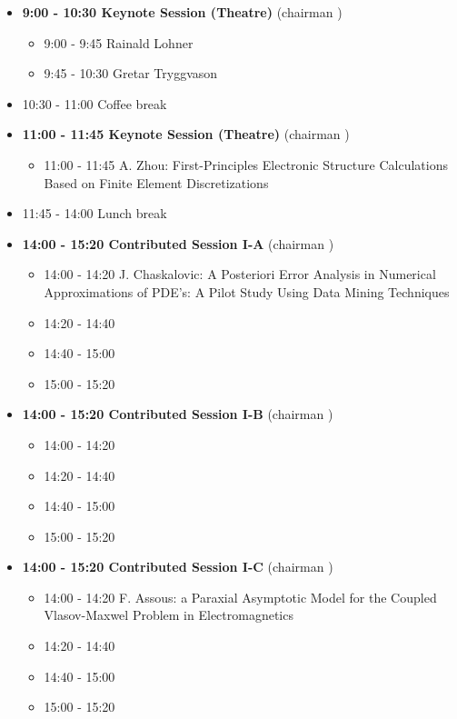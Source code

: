 \documentclass[10pt, A4]{article}%
\begin{document}
\begin{itemize}    
  \item {\bf 9:00 - 10:30 Keynote Session (Theatre)} (chairman ) 
  \begin{itemize}
    \item 9:00 - 9:45 Rainald Lohner
    \item 9:45 - 10:30 Gretar Tryggvason
  \end{itemize}
  \item 10:30 - 11:00 Coffee break
  \item {\bf 11:00 - 11:45 Keynote Session (Theatre)} (chairman ) 
  \begin{itemize}
    \item 11:00 - 11:45 {A. Zhou}: {First-Principles Electronic Structure Calculations Based on Finite Element Discretizations}
  \end{itemize}
  \item 11:45 - 14:00 Lunch break      
  \item {\bf 14:00 - 15:20 Contributed Session I-A} (chairman ) 
  \begin{itemize}
    \item 14:00 - 14:20 {J. Chaskalovic}: {A Posteriori Error Analysis in Numerical Approximations of PDE's: A Pilot Study Using Data Mining Techniques}
    \item 14:20 - 14:40 
    \item 14:40 - 15:00 
    \item 15:00 - 15:20 
  \end{itemize}
  \item {\bf 14:00 - 15:20 Contributed Session I-B} (chairman ) 
  \begin{itemize}
    \item 14:00 - 14:20 
    \item 14:20 - 14:40 
    \item 14:40 - 15:00 
    \item 15:00 - 15:20 
  \end{itemize}
    \item {\bf 14:00 - 15:20 Contributed Session I-C} (chairman ) 
  \begin{itemize}
    \item 14:00 - 14:20 {F. Assous}: {a Paraxial Asymptotic Model for the Coupled Vlasov-Maxwel Problem in Electromagnetics}
    \item 14:20 - 14:40 
    \item 14:40 - 15:00 
    \item 15:00 - 15:20 
  \end{itemize}

\end{itemize}
\end{document}
